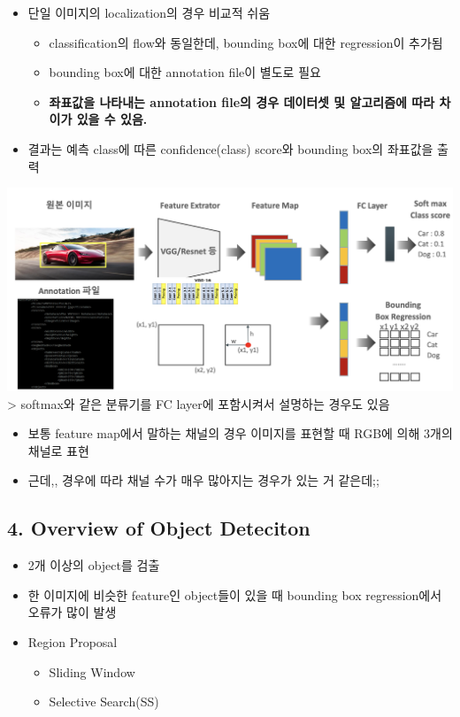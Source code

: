 \documentclass[
]{article}
\providecommand{\tightlist}{%
  \setlength{\itemsep}{0pt}\setlength{\parskip}{0pt}}
\begin{document}
\begin{itemize}
\tightlist
\item
  단일 이미지의 localization의 경우 비교적 쉬움

  \begin{itemize}
  \tightlist
  \item
    classification의 flow와 동일한데, bounding box에 대한 regression이
    추가됨
  \item
    bounding box에 대한 annotation file이 별도로 필요
  \item
    \textbf{좌표값을 나타내는 annotation file의 경우 데이터셋 및
    알고리즘에 따라 차이가 있을 수 있음.}
  \end{itemize}
\item
  결과는 예측 class에 따른 confidence(class) score와 bounding box의
  좌표값을 출력
\end{itemize}

\includegraphics{figs/Chapter1-1.png} \textgreater{} softmax와 같은
분류기를 FC layer에 포함시켜서 설명하는 경우도 있음

\begin{itemize}
\tightlist
\item
  보통 feature map에서 말하는 채널의 경우 이미지를 표현할 때 RGB에 의해
  3개의 채널로 표현
\item
  근데,, 경우에 따라 채널 수가 매우 많아지는 경우가 있는 거 같은데;;
\end{itemize}

\hypertarget{overview-of-object-deteciton}{%
\subsection{4. Overview of Object
Deteciton}\label{overview-of-object-deteciton}}

\begin{itemize}
\tightlist
\item
  2개 이상의 object를 검출
\item
  한 이미지에 비슷한 feature인 object들이 있을 때 bounding box
  regression에서 오류가 많이 발생
\item
  Region Proposal

  \begin{itemize}
  \tightlist
  \item
    Sliding Window
  \item
    Selective Search(SS)
  \end{itemize}
\end{itemize}
\end{document}
